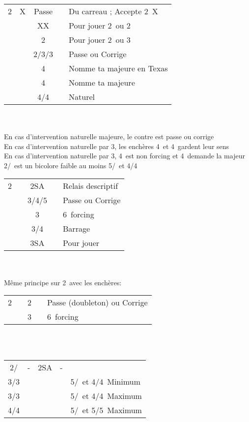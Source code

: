\documentclass[a4paper, oneside, 11pt]{report}
\begin{document}
	\begin{tabular}{cccc|l}
	2\carreau & X & Passe && Du carreau ; Accepte 2\carreau\ X\\
	&& XX && Pour jouer 2\coeur\ ou 2\pique\\
	&& 2\coeur && Pour jouer 2\coeur\ ou 3\pique\\
	&& 2\pique/3\coeur/3\pique && Passe ou Corrige\\
	&& 4\trefle && Nomme ta majeure en Texas\\
	&& 4\carreau && Nomme ta majeure\\
	&& 4\coeur/4\pique && Naturel\\
	\end{tabular}\\\\
	En cas d'intervention naturelle majeure, le contre est passe ou corrige\\	
	En cas d'intervention naturelle par 3\trefle, les enchères 4\trefle\ et 4\carreau\ gardent leur sens\\	
	En cas d'intervention naturelle par 3\carreau, 4\trefle\ est non forcing et 4\carreau\ demande la majeur\\

\newpage
	2\coeur/\pique\ est un bicolore faible au moins 5\coeur/\pique\ et 4\trefle/4\carreau\\

	\begin{tabular}{cccc|l}
	2\pique && 2SA && Relais descriptif\\
	&& 3\trefle/4\trefle/5\trefle && Passe ou Corrige\\
	&& 3\coeur && 6\coeur\ forcing\\
	&& 3\pique/4\pique && Barrage\\
	&& 3SA && Pour jouer\\
	\end{tabular}\\\\
	
	Même principe sur 2\coeur\ avec les enchères:
	\begin{tabular}{cccc|l}
	2\coeur && 2\pique && Passe (doubleton) ou Corrige\\
	&& 3\pique && 6\pique\ forcing\\
	\end{tabular}\\\\

	\begin{tabular}{cccc|l}
	2\coeur/\pique & - & 2SA & - &\\
	3\trefle/3\carreau &&&& 5\coeur/\pique\ et 4\trefle/4\carreau\ Minimum\\
	3\coeur/3\pique &&&& 5\coeur/\pique\ et 4\trefle/4\carreau\ Maximum\\
	4\trefle/4\carreau &&&& 5\coeur/\pique\ et 5\trefle/5\carreau\ Maximum\\
	\end{tabular}\\\\
	
\end{document}
